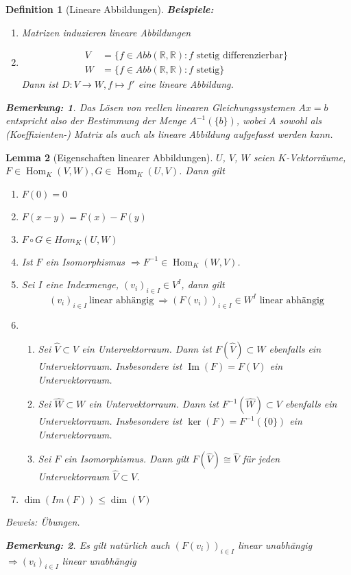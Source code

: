\documentclass{report}
\newcommand{\R}{\mathbb{R}}
\DeclareMathOperator{\Hom}{Hom}
\DeclareMathOperator{\Ima}{Im}
\theoremstyle{customrem}
\newtheorem*{bem}{Bemerkung:}
\theoremstyle{customdef}
\newtheorem{definition}{Definition}[chapter]
\newtheorem{lem}[definition]{Lemma}
\begin{document}
\begin{definition}[Lineare Abbildungen]
		\noindent\textbf{Beispiele: }
		\begin{enumerate}
			\item Matrizen induzieren lineare Abbildungen
			\item 
			\begin{align*}
				V &= \{f \in Abb(\R, \R) : f \text{ stetig differenzierbar}\}\\
				W &= \{f \in Abb(\R, \R) : f \text{ stetig}\}
			\end{align*}
			Dann ist $D : V \to W, f \mapsto f'$ eine lineare Abbildung.
		\end{enumerate}
		
		\begin{bem}
			Das Lösen von reellen linearen Gleichungssystemen $Ax = b$ entspricht also der Bestimmung der Menge $A^{-1}(\{b\})$, wobei $A$ sowohl als (Koeffizienten-) Matrix als auch als lineare Abbildung aufgefasst werden kann.
		\end{bem}
	\end{definition}

	\begin{lem}[Eigenschaften linearer Abbildungen]
		\label{lem32}
		$U$, $V$, $W$ seien $K$-Vektorräume, $F \in \Hom_K(V,W), G \in \Hom_K(U, V)$. Dann gilt
		\begin{enumerate}
			\item $F(0) = 0$
			\item $F(x - y) = F(x) - F(y)$
			\item $F \circ G \in Hom_K(U, W)$
			\item Ist $F$ ein Isomorphismus $\Rightarrow F^{-1} \in \Hom_K(W, V)$.
			\item Sei $I$ eine  Indexmenge, $(v_i)_{i \in I} \in V^I$, dann gilt
				$$(v_i)_{i \in I}\ \text{linear abhängig} \ \Rightarrow (F(v_i))_{i \in I} \in W^I \text{ linear abhängig}$$
			\item 
				\begin{enumerate}
					\item Sei $\hat{V} \subset V$ ein Untervektorraum. Dann ist $F(\hat{V}) \subset W$  ebenfalls ein Untervektorraum. Insbesondere ist $\Ima(F) = F(V)$ ein Untervektorraum.
					\item Sei $\hat{W} \subset W$ ein Untervektorraum. Dann ist $F^{-1}(\hat{W}) \subset V$  ebenfalls ein Untervektorraum. Insbesondere ist $\ker(F) = F^{-1}(\{0\})$ ein Untervektorraum.
					\item Sei $F$ ein Isomorphismus. Dann gilt $F(\hat{V}) \cong \hat{V}$ für jeden Untervektorraum $\hat{V} \subset V$. 
				\end{enumerate}
			\item $\dim(Im(F)) \leq \dim(V)$
		\end{enumerate}
		Beweis: Übungen.\\
		\begin{bem}
			Es gilt natürlich auch $(F (v_i))_{i \in I}$ linear unabhängig $\Rightarrow (v_i)_{i \in I}$ linear unabhängig	
		\end{bem}
	\end{lem}
	
\end{document}
